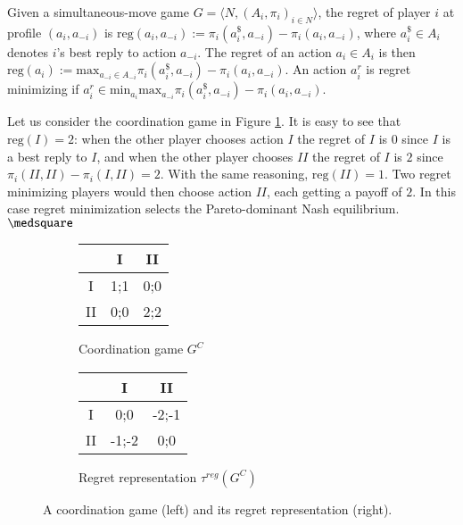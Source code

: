\documentclass[fleqn,reqno,11pt]{article}
\begin{document}
\begin{definition} \label{defn:regret} Given a simultaneous-move
  game $ G=\langle N, (A_i , \pi_i)_{i \in N} \rangle $, the regret of player $i$ at profile
  $(a_i,a_{-i})$ is $\text{reg}(a_i,a_{-i}):= \pi_i(a_i^\$,a_{-i})-\pi_i(a_i,a_{-i}) $, where
  $a_i^\$ \in A_i$ denotes $i$'s best reply to action $a_{-i} $. The regret of an action
  $a_i \in A_i$ is then
  $\text{reg}(a_i):= \text{max}_{a_{-i}\in A_{-i}} \pi_i(a_i^\$,a_{-i})-\pi_i(a_i,a_{-i}) $. An
  action $a^{r}_i $ is regret minimizing if
  $a^{r}_i \in \text{min}_{a_i} \text{max}_{a_{-i}} \pi_i(a_i^\$,a_{-i})-\pi_i(a_i,a_{-i}) $.
\end{definition}

\begin{example}
  Let us consider the coordination game in Figure \ref{coordgame1}. It is easy to see that
  $\text{reg}(I)=2$: when the other player chooses action $I$ the regret of $I$ is $0$ since
  $I$ is a best reply to $I$, and when the other player chooses $II$ the regret of $I$ is $2$
  since $\pi_i(II,II)-\pi_i(I,II)=2$. With the same reasoning, $\text{reg}(II)=1$. Two regret
  minimizing players would then choose action $II$, each getting a payoff of $2$. In this case
  regret minimization selects the Pareto-dominant Nash equilibrium. $ \medsquare $

\begin{figure}

  \begin{subfigure}[b]{0.4\textwidth}
    \centering
    \begin{tabular}{ccc}
      \toprule
      & I & II \\
      \midrule
      I & 1;1 & 0;0 \\
      \hline 
      II & 0;0 & 2;2\\
      \bottomrule
    \end{tabular}
    \caption{Coordination game $G^C$}
    \label{coordgame1}
  \end{subfigure}
  \hfill
  \begin{subfigure}[b]{0.4\textwidth}
    \centering
    \begin{tabular}{ccc}
      \toprule
      & I & II \\
      \midrule
      I & 0;0 & -2;-1 \\
      \hline 
      II & -1;-2 & 0;0\\
      \bottomrule
    \end{tabular}
    \caption{Regret representation $\tau^{reg}(G^C)$}
    \label{coordgame1reg}
  \end{subfigure}
  \caption{A coordination game (left) and its regret representation (right).}
    \label{coordgame1mainFig}
\end{figure}



\end{example}
\end{document}
